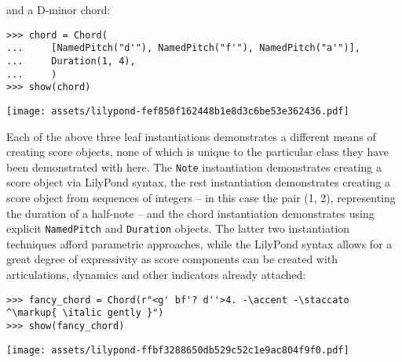 \noindent and a D-minor chord:

\begin{comment}
<abjad>
chord = Chord(
    [NamedPitch("d'"), NamedPitch("f'"), NamedPitch("a'")],
    Duration(1, 4),
    )
show(chord)
</abjad>
\end{comment}

\begin{abjadbookoutput}
\begin{singlespacing}
\vspace{-0.5\baselineskip}
\begin{lstlisting}
>>> chord = Chord(
...     [NamedPitch("d'"), NamedPitch("f'"), NamedPitch("a'")],
...     Duration(1, 4),
...     )
>>> show(chord)
\end{lstlisting}
\noindent\texttt{[image: assets/lilypond-fef850f162448b1e8d3c6be53e362436.pdf]}
\end{singlespacing}
\end{abjadbookoutput}

\noindent Each of the above three leaf instantiations demonstrates a different
means of creating score objects, none of which is unique to the particular
class they have been demonstrated with here. The \texttt{Note} instantiation
demonstrates creating a score object via LilyPond syntax, the rest
instantiation demonstrates creating a score object from
sequences of integers -- in this case the pair (1, 2), representing the
duration of a half-note -- and the chord instantiation demonstrates using
explicit \texttt{NamedPitch} and \texttt{Duration} objects. The latter two
instantiation techniques afford parametric approaches, while the LilyPond
syntax allows for a great degree of expressivity as score components can be
created with articulations, dynamics and other indicators already attached:

\begin{comment}
<abjad>
fancy_chord = Chord(r"<g' bf'? d''>4. -\accent -\staccato ^\markup{ \italic gently }")
show(fancy_chord)
</abjad>
\end{comment}

\begin{abjadbookoutput}
\begin{singlespacing}
\vspace{-0.5\baselineskip}
\begin{lstlisting}
>>> fancy_chord = Chord(r"<g' bf'? d''>4. -\accent -\staccato ^\markup{ \italic gently }")
>>> show(fancy_chord)
\end{lstlisting}
\noindent\texttt{[image: assets/lilypond-ffbf3288650db529c52c1e9ac804f9f0.pdf]}
\end{singlespacing}
\end{abjadbookoutput}

